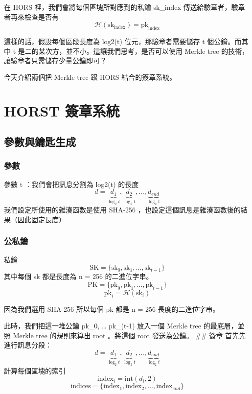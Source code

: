 \documentclass[
]{article}
\author{}
\date{}
\begin{document}
在 HORS 裡，我們會將每個區塊所對應到的私鑰 sk\_index
傳送給驗章者，驗章者再來檢查是否有 \[
\mathcal{H}(\mathrm{sk}_{\mathrm{index}} )= \mathrm{pk}_{\mathrm{index}}
\]

這樣的話，假設每個區段長度為 log2(t) 位元，那驗章者需要儲存 t
個公鑰。而其中 t 是二的某次方，並不小。這讓我們思考，是否可以使用 Merkle
tree 的技術，讓驗章者只需儲存少量公鑰即可？

今天介紹兩個把 Merkle tree 跟 HORS 結合的簽章系統。

\hypertarget{horst-ux7c3dux7ae0ux7cfbux7d71}{%
\section{HORST 簽章系統}\label{horst-ux7c3dux7ae0ux7cfbux7d71}}

\hypertarget{ux53c3ux6578ux8207ux9470ux5319ux751fux6210}{%
\subsection{參數與鑰匙生成}\label{ux53c3ux6578ux8207ux9470ux5319ux751fux6210}}

\hypertarget{ux53c3ux6578}{%
\subsubsection{參數}\label{ux53c3ux6578}}

參數 t ：我們會把訊息分割為 log2(t) 的長度 \[
d = \underbrace{ d_{1} }_{ \log_{2}t },\underbrace{ d_{2} }_{ \log_{2}t},\dots,\underbrace{ d_{end} }_{ \log_{2}t}
\] 我們設定所使用的雜湊函數是使用 SHA-256
，也設定這個訊息是雜湊函數後的結果（因此固定長度）

\hypertarget{ux516cux79c1ux9470}{%
\subsubsection{公私鑰}\label{ux516cux79c1ux9470}}

私鑰 \[
\mathrm{SK}=\{\mathrm{sk}_{0},\mathrm{sk}_{1},\dots,\mathrm{sk}_{t-1}\}
\] 其中每個 sk 都是長度為 n = 256 的二進位字串。 \[
\mathrm{PK}=\{\mathrm{pk}_{0},\mathrm{pk}_{1},\dots,\mathrm{pk}_{t-1}\}
\] \[
\mathrm{pk}_{i}= \mathcal{H}(\mathrm{sk}_{i})
\]

因為我們選用 SHA-256 所以每個 pk 都是 n = 256 長度的二進位字串。

此時，我們把這一堆公鑰 pk\_0, \ldots{} pk\_(t-1) 放入一個 Merkle tree
的最底層，並照 Merkle tree 的規則來算出 root 。將這個 root 發送為公鑰。
\#\# 簽章 首先先進行訊息分段： \[
d = \underbrace{ d_{1} }_{ \log_{2}t },\underbrace{ d_{2} }_{ \log_{2}t},\dots,\underbrace{ d_{end} }_{ \log_{2}t}
\] 計算每個區塊的索引 \[
\mathrm{index}_{i} = \mathrm{int}(d_{i},2)
\] \[
\mathrm{indices} = \{ \mathrm{index}_{1},\mathrm{index}_{2},\dots, \mathrm{index}_{end}\}
\]
\end{document}
